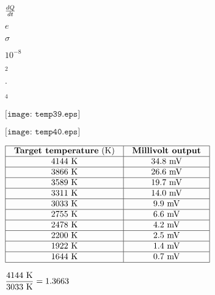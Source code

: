 \documentclass[12pt,a4paper,margin=2cm]{book}
\def\lthtmlcheckvsize{\ifdim\ht\sizebox<\vsize 
  \ifdim\wd\sizebox<\hsize\expandafter\hfill\fi \expandafter\vfill
  \else\expandafter\vss\fi}%
\begin{document}
{\newpage\clearpage
{}%
$ dQ \over dt$%
\lthtmlindisplaymathZ
\lthtmlcheckvsize\clearpage}

{\newpage\clearpage
{}%
$ e$%
\lthtmlindisplaymathZ
\lthtmlcheckvsize\clearpage}

{\newpage\clearpage
{}%
$ \sigma$%
\lthtmlindisplaymathZ
\lthtmlcheckvsize\clearpage}

{\newpage\clearpage
{}%
$ 10^{-8}$%
\lthtmlindisplaymathZ
\lthtmlcheckvsize\clearpage}

{\newpage\clearpage
{}%
$ ^{2}$%
\lthtmlindisplaymathZ
\lthtmlcheckvsize\clearpage}

{\newpage\clearpage
{}%
$ \cdot$%
\lthtmlindisplaymathZ
\lthtmlcheckvsize\clearpage}

{\newpage\clearpage
{}%
$ ^{4}$%
\lthtmlindisplaymathZ
\lthtmlcheckvsize\clearpage}

{\newpage\clearpage
{}%
$\displaystyle \texttt{[image: temp39.eps]}$%
\lthtmlindisplaymathZ
\lthtmlcheckvsize\clearpage}

{\newpage\clearpage
{}%
$\displaystyle \texttt{[image: temp40.eps]}$%
\lthtmlindisplaymathZ
\lthtmlcheckvsize\clearpage}

{\newpage\clearpage
{}%
$\displaystyle \vbox{\offinterlineskip
\halign{\strut
\vrule \quad\hfil # \  \hfil & 
\vrule \quad\hfil # \  \hfil \vrule \cr
\noalign{\hrule }
\textbf{Target temperature} (K) & \textbf{Millivolt output} \cr
\noalign{\hrule }
4144 K & 34.8 mV \cr
\noalign{\hrule }
3866 K & 26.6 mV \cr
\noalign{\hrule }
3589 K & 19.7 mV \cr
\noalign{\hrule }
3311 K & 14.0 mV \cr
\noalign{\hrule }
3033 K & 9.9 mV \cr
\noalign{\hrule }
2755 K & 6.6 mV \cr
\noalign{\hrule }
2478 K & 4.2 mV \cr
\noalign{\hrule }
2200 K & 2.5 mV \cr
\noalign{\hrule }
1922 K & 1.4 mV \cr
\noalign{\hrule }
1644 K & 0.7 mV \cr
\noalign{\hrule }
} %
}$%
\lthtmlindisplaymathZ
\lthtmlcheckvsize\clearpage}

{\newpage\clearpage
{}%
$\displaystyle {4144 \hbox{ K} \over 3033 \hbox{ K}} = 1.3663$%
\lthtmlindisplaymathZ
\lthtmlcheckvsize\clearpage}
\end{document}
